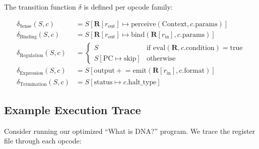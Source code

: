 The transition function $\delta$ is defined per opcode family:

\begin{align}
\delta_{\text{Sense}}(S, c) &= S[\mathbf{R}[r_{\text{out}}] \mapsto \text{perceive}(\text{Context}, c.\text{params})] \\
\delta_{\text{Binding}}(S, c) &= S[\mathbf{R}[r_{\text{out}}] \mapsto \text{bind}(\mathbf{R}[r_{\text{in}}], c.\text{params})] \\
\delta_{\text{Regulation}}(S, c) &= \begin{cases} S & \text{if } \text{eval}(\mathbf{R}, c.\text{condition}) = \text{true} \\ S[\text{PC} \mapsto \text{skip}] & \text{otherwise} \end{cases} \\
\delta_{\text{Expression}}(S, c) &= S[\text{output} \mathrel{+}= \text{emit}(\mathbf{R}[r_{\text{in}}], c.\text{format})] \\
\delta_{\text{Termination}}(S, c) &= S[\text{status} \mapsto c.\text{halt\_type}]
\end{align}

\subsection{Example Execution Trace}

Consider running our optimized ``What is DNA?'' program. We trace the register file through each opcode:

